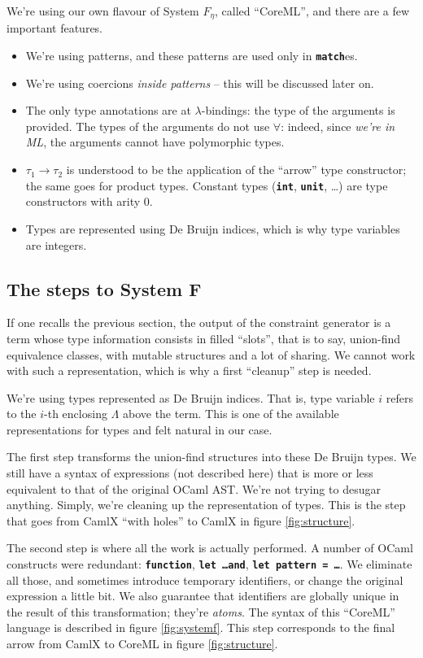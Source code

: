 \documentclass[10pt,a4paper,twoside,titlepage,twocolumn]{article}
\newcommand{\code}[1]{\textbf{\texttt{#1}}}
\begin{document}
We're using our own flavour of System $F_\eta$, called ``CoreML'', and
there are a few important features.
\begin{itemize}
  \item We're using patterns, and these patterns are used only in
    \code{match}es.
  \item We're using coercions \emph{inside patterns} -- this will be discussed
    later on.
  \item The only type annotations are at $\lambda$-bindings: the type of the
    arguments is provided. The types of the arguments do not use $\forall$:
    indeed, since \emph{we're in ML}, the arguments cannot have polymorphic
    types.
  \item $\tau_1 \to \tau_2$ is understood to be the application of the ``arrow''
    type constructor; the same goes for product types. Constant types
    (\code{int}, \code{unit}, …) are type constructors with arity 0.
  \item Types are represented using De Bruijn indices, which is why type
    variables are integers.
\end{itemize}

\subsection{The steps to System F}

If one recalls the previous section, the output of the constraint generator is a
term whose type information consists in filled ``slots'', that is to say,
union-find equivalence classes, with mutable structures and a lot of sharing. We
cannot work with such a representation, which is why a first ``cleanup'' step is
needed.

We're using types represented as De Bruijn indices. That is, type variable
$i$ refers to the $i$-th enclosing $\Lambda$ above the term. This is one of the
available representations for types and felt natural in our case.

The first step transforms the union-find structures into these De Bruijn types.
We still have a syntax of expressions (not described here) that is more or less
equivalent to that of the original OCaml AST. We're not trying to desugar
anything. Simply, we're cleaning up the representation of types. This is the
step that goes from CamlX ``with holes'' to CamlX in figure \ref{fig:structure}.

The second step is where all the work is actually performed. A number of OCaml
constructs were redundant: \code{function}, \code{let \dots\;and}, \code{let
pattern = \dots}. We eliminate all those, and sometimes introduce temporary
identifiers, or change the original expression a little bit. We also guarantee
that identifiers are globally unique in the result of this transformation;
they're \emph{atoms}. The syntax of this ``CoreML'' language is described in
figure \vref{fig:systemf}. This step corresponds to the final arrow from CamlX
to CoreML in figure \ref{fig:structure}.
\end{document}
